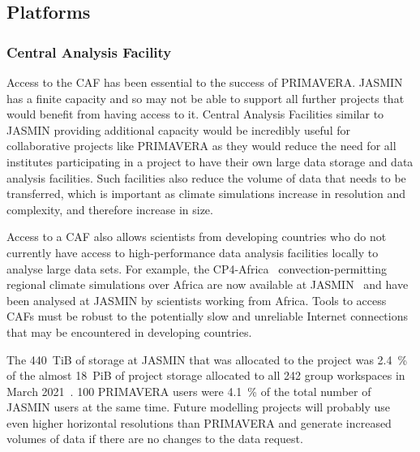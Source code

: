\documentclass[gmd, manuscript]{copernicus}
\begin{document}
\subsection{Platforms}

\subsubsection{Central Analysis Facility}
Access to the CAF has been essential to the success of PRIMAVERA. JASMIN has a finite capacity and so may not be able to support all further projects that would benefit from having access to it. Central Analysis Facilities similar to JASMIN providing additional capacity would be incredibly useful for collaborative projects like PRIMAVERA as they would reduce the need for all institutes participating in a project to have their own large data storage and data analysis facilities. Such facilities also reduce the volume of data that needs to be transferred, which is important as climate simulations increase in resolution and complexity, and therefore increase in size.

Access to a CAF also allows scientists from developing countries who do not currently have access to high-performance data analysis facilities locally to analyse large data sets. For example, the CP4-Africa~\citep{Stratton2018} convection-permitting regional climate simulations over Africa are now available at JASMIN~\citep{Senior2019} and have been analysed at JASMIN by scientists working from Africa. Tools to access CAFs must be robust to the potentially slow and unreliable Internet connections that may be encountered in developing countries.

The 440~TiB of storage at JASMIN that was allocated to the project was 2.4~\% of the almost 18~PiB of project storage allocated to all 242 group workspaces in March 2021~\citep{Townsend2021}. 100 PRIMAVERA users were 4.1~\% of the total number of JASMIN users at the same time. Future modelling projects will probably use even higher horizontal resolutions than PRIMAVERA and generate increased volumes of data if there are no changes to the data request. 
\end{document}
